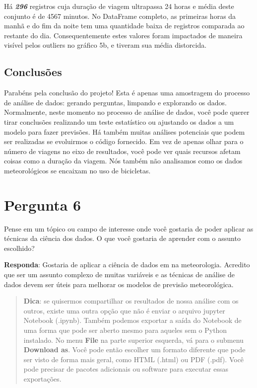 \documentclass[11pt]{article}
\begin{document}
    Há \textbf{\emph{296}} registros cuja duração de viagem ultrapassa 24
horas e média deste conjunto é de 4567 minutos. No DataFrame completo,
as primeiras horas da manhã e do fim da noite tem uma quantidade baixa
de registros comparada ao restante do dia. Consequentemente estes
valores foram impactados de maneira visível pelos outliers no gráfico
5b, e tiveram sua média distorcida.

    \subsection{Conclusões}\label{conclusuxf5es}

Parabéns pela conclusão do projeto! Esta é apenas uma amostragem do
processo de análise de dados: gerando perguntas, limpando e explorando
os dados. Normalmente, neste momento no processo de análise de dados,
você pode querer tirar conclusões realizando um teste estatístico ou
ajustando os dados a um modelo para fazer previsões. Há também muitas
análises potenciais que podem ser realizadas se evoluirmos o código
fornecido. Em vez de apenas olhar para o número de viagens no eixo de
resultados, você pode ver quais recursos afetam coisas como a duração da
viagem. Nós também não analisamos como os dados meteorológicos se
encaixam no uso de bicicletas.

    \section{Pergunta 6}\label{pergunta-6}

Pense em um tópico ou campo de interesse onde você gostaria de poder
aplicar as técnicas da ciência dos dados. O que você gostaria de
aprender com o assunto escolhido?

\textbf{Responda}: Gostaria de aplicar a ciência de dados em na
meteorologia. Acredito que ser um assunto complexo de muitas variáveis e
as técnicas de análise de dados devem ser úteis para melhorar os modelos
de previsão meteorológica.

    \begin{quote}
\textbf{Dica}: se quisermos compartilhar os resultados de nossa análise
com os outros, existe uma outra opção que não é enviar o arquivo jupyter
Notebook (.ipynb). Também podemos exportar a saída do Notebook de uma
forma que pode ser aberto mesmo para aqueles sem o Python instalado. No
menu \textbf{File} na parte superior esquerda, vá para o submenu
\textbf{Download as}. Você pode então escolher um formato diferente que
pode ser visto de forma mais geral, como HTML (.html) ou PDF (.pdf).
Você pode precisar de pacotes adicionais ou software para executar essas
exportações.
\end{quote}


    
    
    
    
\end{document}
